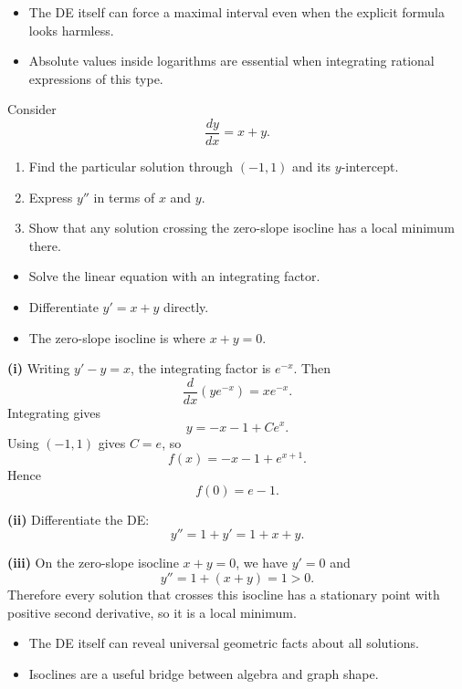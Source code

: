 \begin{takeaways}
\begin{itemize}[leftmargin=*]
    \item The DE itself can force a maximal interval even when the explicit formula looks harmless.
    \item Absolute values inside logarithms are essential when integrating rational expressions of this type.
\end{itemize}
\end{takeaways}

\begin{problem}
Consider
\[
\frac{dy}{dx}=x+y.
\]
\begin{enumerate}
    \item[\textbf{i}] Find the particular solution through $(-1,1)$ and its $y$-intercept.
    \item[\textbf{ii}] Express $y''$ in terms of $x$ and $y$.
    \item[\textbf{iii}] Show that any solution crossing the zero-slope isocline has a local minimum there.
\end{enumerate}
\end{problem}

\begin{hint}
\begin{itemize}[leftmargin=*]
    \item Solve the linear equation with an integrating factor.
    \item Differentiate $y'=x+y$ directly.
    \item The zero-slope isocline is where $x+y=0$.
\end{itemize}
\end{hint}

\begin{solution}
\textbf{(i)} Writing $y'-y=x$, the integrating factor is $e^{-x}$. Then
\[
\frac{d}{dx}(ye^{-x})=xe^{-x}.
\]
Integrating gives
\[
y=-x-1+Ce^x.
\]
Using $(-1,1)$ gives $C=e$, so
\[
\boxed{f(x)=-x-1+e^{x+1}}.
\]
Hence
\[
f(0)=e-1.
\]

\textbf{(ii)} Differentiate the DE:
\[
y''=1+y'=1+x+y.
\]

\textbf{(iii)} On the zero-slope isocline $x+y=0$, we have $y'=0$ and
\[
y''=1+(x+y)=1>0.
\]
Therefore every solution that crosses this isocline has a stationary point with positive second derivative, so it is a local minimum.
\end{solution}

\begin{takeaways}
\begin{itemize}[leftmargin=*]
    \item The DE itself can reveal universal geometric facts about all solutions.
    \item Isoclines are a useful bridge between algebra and graph shape.
\end{itemize}
\end{takeaways}

